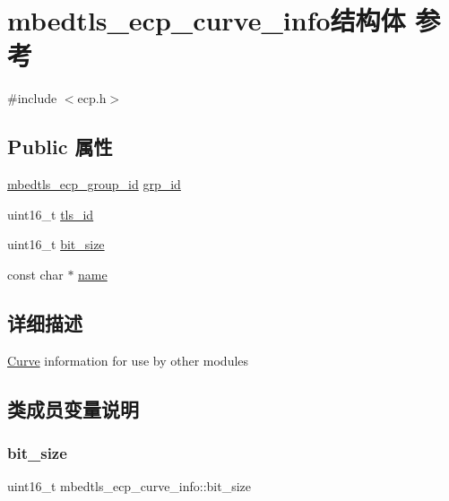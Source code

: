 \hypertarget{structmbedtls__ecp__curve__info}{}\section{mbedtls\+\_\+ecp\+\_\+curve\+\_\+info结构体 参考}
\label{structmbedtls__ecp__curve__info}


{\ttfamily \#include $<$ecp.\+h$>$}

\subsection*{Public 属性}
\begin{DoxyCompactItemize}
\item 
\hyperlink{ecp_8h_af79e530ea8f8416480f805baa20b1a2d}{mbedtls\+\_\+ecp\+\_\+group\+\_\+id} \hyperlink{structmbedtls__ecp__curve__info_a1fdb81fb58ed6039b5c9fe1a3c82852b}{grp\+\_\+id}
\item 
uint16\+\_\+t \hyperlink{structmbedtls__ecp__curve__info_ac2754d3ed70b7cc54ba3567372763551}{tls\+\_\+id}
\item 
uint16\+\_\+t \hyperlink{structmbedtls__ecp__curve__info_a893162d86716513661ccb05b4a450af1}{bit\+\_\+size}
\item 
const char $\ast$ \hyperlink{structmbedtls__ecp__curve__info_a123ba197ecf3a5573e28030393f7b1dd}{name}
\end{DoxyCompactItemize}


\subsection{详细描述}
\hyperlink{class_curve}{Curve} information for use by other modules 

\subsection{类成员变量说明}
\mbox{\label{structmbedtls__ecp__curve__info_a893162d86716513661ccb05b4a450af1}} 
\subsubsection{\texorpdfstring{bit\+\_\+size}{bit\_size}}
{\footnotesize\ttfamily uint16\+\_\+t mbedtls\+\_\+ecp\+\_\+curve\+\_\+info\+::bit\+\_\+size}

